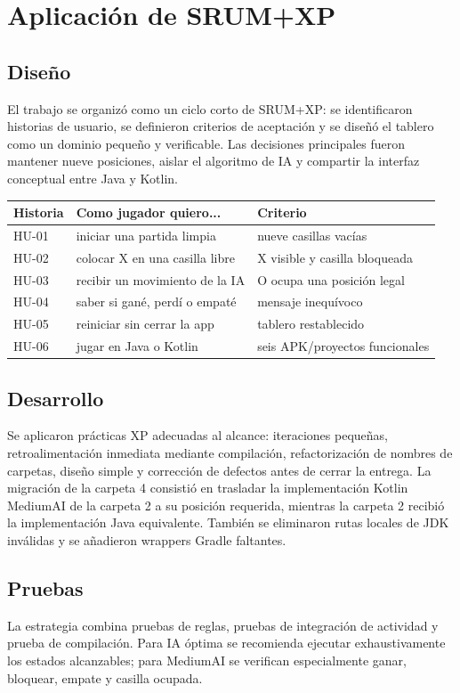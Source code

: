\documentclass[stu,a4paper,12pt,floatsintext]{apa7}
\begin{document}
\section{Aplicación de SRUM+XP}
\subsection{Diseño}
El trabajo se organizó como un ciclo corto de SRUM+XP: se identificaron
historias de usuario, se definieron criterios de aceptación y se diseñó el
tablero como un dominio pequeño y verificable. Las decisiones principales
fueron mantener nueve posiciones, aislar el algoritmo de IA y compartir la
interfaz conceptual entre Java y Kotlin.

\begin{longtable}{p{}p{}p{}}
\toprule
\textbf{Historia} & \textbf{Como jugador quiero...} & \textbf{Criterio}\\
\midrule
HU-01 & iniciar una partida limpia & nueve casillas vacías\\
HU-02 & colocar X en una casilla libre & X visible y casilla bloqueada\\
HU-03 & recibir un movimiento de la IA & O ocupa una posición legal\\
HU-04 & saber si gané, perdí o empaté & mensaje inequívoco\\
HU-05 & reiniciar sin cerrar la app & tablero restablecido\\
HU-06 & jugar en Java o Kotlin & seis APK/proyectos funcionales\\
\bottomrule
\end{longtable}

\subsection{Desarrollo}
Se aplicaron prácticas XP adecuadas al alcance: iteraciones pequeñas,
retroalimentación inmediata mediante compilación, refactorización de nombres
de carpetas, diseño simple y corrección de defectos antes de cerrar la
entrega. La migración de la carpeta 4 consistió en trasladar la implementación
Kotlin MediumAI de la carpeta 2 a su posición requerida, mientras la carpeta
2 recibió la implementación Java equivalente. También se eliminaron rutas
locales de JDK inválidas y se añadieron wrappers Gradle faltantes.

\subsection{Pruebas}
La estrategia combina pruebas de reglas, pruebas de integración de actividad y
prueba de compilación. Para IA óptima se recomienda ejecutar exhaustivamente
los estados alcanzables; para MediumAI se verifican especialmente ganar,
bloquear, empate y casilla ocupada.
\end{document}
